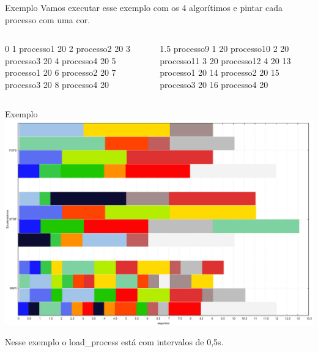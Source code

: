 \documentclass{beamer}
\begin{document}
\begin{frame}{Exemplo}
	Vamos executar esse exemplo com os 4 algorítimos e pintar cada processo com uma cor.
	\begin{columns}[T,onlytextwidth]
		
		0 1 processo1 20  2 processo2 20  3 processo3 20  4 processo4 20  5 processo1 20  6 processo2 20  7 processo3 20  8 processo4 20 \newline
		
		
		
		
		1.5 processo9 1 20  processo10 2 20  processo11 3 20  processo12 4 20  13 processo1 20  14 processo2 20  15 processo3 20  16 processo4 20
		
		
	\end{columns}
\end{frame}

\begin{frame}{Exemplo}
	\includegraphics[width=\textwidth]{graphs/comparacao}
	
	{\tiny *Nesse exemplo o load\_process está com intervalos de 0,5s.}
\end{frame}
\end{document}
